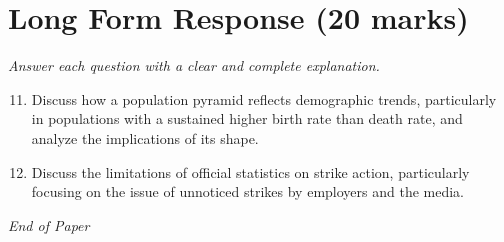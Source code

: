 \documentclass[12pt]{article}
\begin{document}
\section*{Long Form Response (20 marks)}
\textit{Answer each question with a clear and complete explanation.}
\begin{enumerate}[label=\arabic*.]
\setcounter{enumi}{10}
\item Discuss how a population pyramid reflects demographic trends, particularly in populations with a sustained higher birth rate than death rate, and analyze the implications of its shape.
\item Discuss the limitations of official statistics on strike action, particularly focusing on the issue of unnoticed strikes by employers and the media.
\end{enumerate}

\vfill
\noindent\textit{End of Paper}
\end{document}
